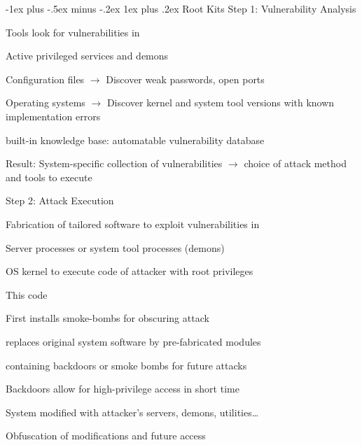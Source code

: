 \documentclass[a4paper]{article}
\makeatletter
\renewcommand{\subsubsection}{\@startsection{subsubsection}{3}{0mm}%
                {-1ex plus -.5ex minus -.2ex}%
                {1ex plus .2ex}%
                {\normalfont\small\bfseries}}
\makeatother
\begin{document}
\begin{multicols}{3}
    \subsubsection{Root Kits}
    Step 1: Vulnerability Analysis
    \begin{itemize*}
        \item Tools look for vulnerabilities in
        \begin{itemize*}
            \item Active privileged services and demons
            \item Configuration files $\rightarrow$ Discover weak passwords, open ports
            \item Operating systems $\rightarrow$ Discover kernel and system tool versions with known implementation errors
        \end{itemize*}
        \item built-in knowledge base: automatable vulnerability database
        \item Result: System-specific collection of vulnerabilities $\rightarrow$ choice of attack method and tools to execute
    \end{itemize*}
    Step 2: Attack Execution
    \begin{itemize*}
        \item Fabrication of tailored software to exploit vulnerabilities in
        \begin{itemize*}
            \item Server processes or system tool processes (demons)
            \item OS kernel to execute code of attacker with root privileges
        \end{itemize*}
        \item This code
        \begin{itemize*}
            \item First installs smoke-bombs for obscuring attack
            \item replaces original system software by pre-fabricated modules
            \item containing backdoors or smoke bombs for future attacks
        \end{itemize*}
        \item Backdoors allow for high-privilege access in short time
        \item System modified with attacker’s servers, demons, utilities\dots
        \item Obfuscation of modifications and future access

\end{itemize*}
\end{multicols}
\end{document}
